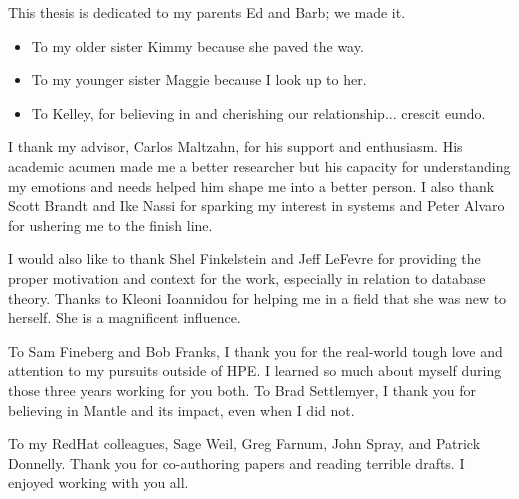 \begin{frontmatter}
\begin{abstract}
	\end{abstract}
	\begin{dedication}
                \vspace*{\fill}
                \noindent This thesis is dedicated to my parents Ed and Barb; we made it.
                \begin{itemize}
                  \item[] To my older sister Kimmy because she paved the way.
                  \item[] To my younger sister Maggie because I look up to her.
                  \item[] To Kelley, for believing in and cherishing our  relationship... crescit eundo.
                \end{itemize}
                \vspace*{\fill}
	\end{dedication}
	\begin{acknowledgements}

I thank my advisor, Carlos Maltzahn, for his support and enthusiasm. His
academic acumen made me a better researcher but his capacity for understanding
my emotions and needs helped him shape me into a better person. I also thank
Scott Brandt and Ike Nassi for sparking my interest in systems and Peter Alvaro
for ushering me to the finish line.

I would also like to thank Shel Finkelstein and Jeff LeFevre for providing the
proper motivation and context for the work, especially in relation to database
theory. Thanks to Kleoni Ioannidou for helping me in a field that she was new
to herself. She is a magnificent influence.

To Sam Fineberg and Bob Franks, I thank you for the real-world tough love and
attention to my pursuits outside of HPE. I learned so much about myself during
those three years working for you both. To Brad Settlemyer, I thank you for
believing in Mantle and its impact, even when I did not.

To my RedHat colleagues, Sage Weil, Greg Farnum, John Spray, and Patrick
Donnelly. Thank you for co-authoring papers and reading terrible drafts. I
enjoyed working with you all.


\end{acknowledgements}
\end{frontmatter}
